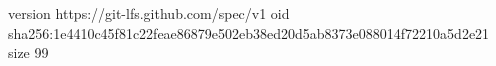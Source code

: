 version https://git-lfs.github.com/spec/v1
oid sha256:1e4410c45f81c22feae86879e502eb38ed20d5ab8373e088014f72210a5d2e21
size 99
